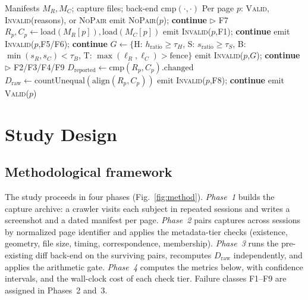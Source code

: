 \documentclass[conference]{IEEEtran}
\newcommand{\Dr}{D_{\mathrm{reported}}}
\newcommand{\Dw}{D_{\mathrm{raw}}}
\begin{document}
\begin{algorithm}[!t]
\caption{Screenshot Evidence Validation (SEV)}\label{alg:sev}
\footnotesize
\begin{algorithmic}[1]
\REQUIRE Manifests $M_R,M_C$; capture files; back-end $\mathrm{cmp}(\cdot,\cdot)$
\ENSURE Per page $p$: \textsc{Valid}, \textsc{Invalid}(reasons), or \textsc{NoPair}
  \STATE emit \textsc{NoPair}($p$); \textbf{continue} \hfill $\triangleright$ F7
 \ENDIF
 \STATE $R_p,C_p\leftarrow \mathrm{load}(M_R[p]),\mathrm{load}(M_C[p])$
  \STATE emit \textsc{Invalid}($p$,F1); \textbf{continue}
 \ENDIF
  \STATE emit \textsc{Invalid}($p$,F5/F6); \textbf{continue}
 \ENDIF
 \STATE $G\leftarrow\{$H: $h_{\mathrm{ratio}}\!\ge\!\tau_H$, S: $s_{\mathrm{ratio}}\!\ge\!\tau_S$, B: $\min(s_R,s_C)\!<\!\tau_B$, T: $\max(\ell_R,\ell_C)\!>\!\mathrm{fence}\}$
  \STATE emit \textsc{Invalid}($p$,$G$); \textbf{continue} \hfill $\triangleright$ F2/F3/F4/F9
 \ENDIF
 \STATE $\Dr\leftarrow \mathrm{cmp}(R_p,C_p).\mathrm{changed}$
 \STATE $\Dw\leftarrow \mathrm{countUnequal}(\mathrm{align}(R_p,C_p))$
 \IF{$\Dr>\Dw$}
  \STATE emit \textsc{Invalid}($p$,F8); \textbf{continue}
 \ENDIF
 \STATE emit \textsc{Valid}($p$)
\ENDFOR
\end{algorithmic}
\end{algorithm}

\section{Study Design}
\subsection{Methodological framework}
The study proceeds in four phases (Fig.~\ref{fig:method}). \emph{Phase~1} builds the capture archive: a crawler visits each subject in repeated sessions and writes a screenshot and a dated manifest per page. \emph{Phase~2} pairs captures across sessions by normalized page identifier and applies the metadata-tier checks (existence, geometry, file size, timing, correspondence, membership). \emph{Phase~3} runs the pre-existing diff back-end on the surviving pairs, recomputes $\Dw$ independently, and applies the arithmetic gate. \emph{Phase~4} computes the metrics below, with confidence intervals, and the wall-clock cost of each check tier. Failure classes F1--F9 are assigned in Phases~2 and~3.
\end{document}
